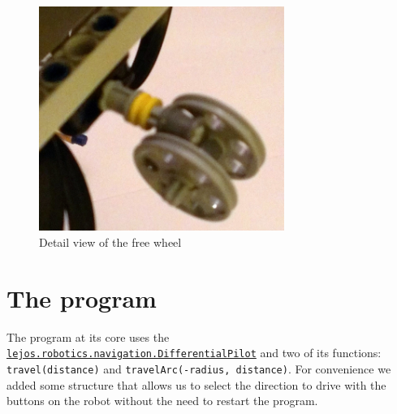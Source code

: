 \documentclass{scrartcl}
\begin{document}
\begin{figure}
 \center
 \includegraphics[width= 8cm]{img/steering_wheel.jpg}
 \caption{Detail view of the free wheel}
 \label{fig:free_wheel}
\end{figure}


\section{The program}

The program at its core uses the \texttt{
\href{http://www.lejos.org/nxt/nxj/api/lejos/robotics/navigation/DifferentialPilot.html}{lejos.robotics.navigation.DifferentialPilot}} and two of its functions: \texttt{travel(distance)} and \texttt{travelArc(-radius, distance)}. For convenience we added some structure that allows us to select the direction to drive with the buttons on the robot without the need to restart the program.
\end{document}
